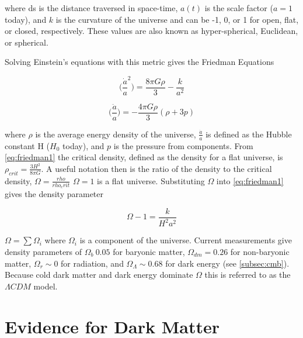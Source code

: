 \noindent where ds is the distance traversed in space-time, $a(t)$ is the scale factor ($a=1$ today), and $k$ is the curvature of the
universe and can be -1, 0, or 1 for open, flat, or closed, respectively.  These values are also known as hyper-spherical,
Euclidean, or spherical.

Solving Einstein's equations with this metric gives the Friedman Equations

\begin{equation}
\Big(\frac{\dot{a}}{a}^{2}\Big) = \frac{8\pi G \rho}{3} - \frac{k}{a^{2}}
\label{eq:friedman1}
\end{equation}

\begin{equation}
\Big(\frac{\ddot{a}}{a}\Big) = -\frac{4\pi G \rho}{3}(\rho + 3p)
\label{eq:friedman2}
\end{equation}

\noindent where $\rho$ is the average energy density of the universe, $\frac{\dot{a}}{a}$ is defined as the Hubble
constant H ($H_{0}$ today), and $p$ is the pressure from components.  From \eqref{eq:friedman1} the critical
density, defined as the density for a flat universe, is $\rho_{crit} = \frac{3H^{2}}{8\pi G}$.  A useful
notation then is the ratio of the density to the critical density, $\Omega = \frac{rho}{rho_crit}$
$\Omega = 1$ is a flat universe.  Substituting
$\Omega$ into \eqref{eq:friedman1} gives the density parameter

\begin{equation}
\Omega - 1 = \frac{k}{H^{2}{a^{2}}}
\end{equation}

\noindent  $\Omega = \sum \Omega_{i}$ where $\Omega_{i}$ is a component of the universe.  Current measurements give density
parameters of $\Omega_{b} ~ 0.05$ for baryonic matter, $\Omega_{dm} = 0.26$ for non-baryonic matter, $\Omega_{r} \sim 0$
for radiation, and $\Omega_{\Lambda} \sim 0.68$ for dark energy (see \ref{subsec:cmb}).  Because cold dark matter
and dark energy dominate $\Omega$ this is referred to as the $\Lambda CDM$ model.



\section[Evidence for Dark Matter][Evidence for Dark Matter]{Evidence for Dark Matter}
